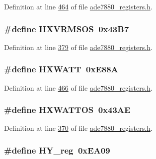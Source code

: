 Definition at line \hyperlink{a00036_source_l00464}{464} of file \hyperlink{a00036_source}{ade7880\-\_\-registers.\-h}.

\hypertarget{a00036_a88614989eb05e4e7fb74c61d77e33abf}{
\subsubsection[{H\-X\-V\-R\-M\-S\-O\-S}]{\setlength{\rightskip}{0pt plus 5cm}\#define H\-X\-V\-R\-M\-S\-O\-S~0x43\-B7}}\label{de/d8c/a00036_a88614989eb05e4e7fb74c61d77e33abf}


Definition at line \hyperlink{a00036_source_l00379}{379} of file \hyperlink{a00036_source}{ade7880\-\_\-registers.\-h}.

\hypertarget{a00036_a41b00ce2b5d9729f5783c2bf4ad50b35}{
\subsubsection[{H\-X\-W\-A\-T\-T}]{\setlength{\rightskip}{0pt plus 5cm}\#define H\-X\-W\-A\-T\-T~0x\-E88\-A}}\label{de/d8c/a00036_a41b00ce2b5d9729f5783c2bf4ad50b35}


Definition at line \hyperlink{a00036_source_l00466}{466} of file \hyperlink{a00036_source}{ade7880\-\_\-registers.\-h}.

\hypertarget{a00036_a648ebd2ef4dfa6ffc1aac4bf47ddf991}{
\subsubsection[{H\-X\-W\-A\-T\-T\-O\-S}]{\setlength{\rightskip}{0pt plus 5cm}\#define H\-X\-W\-A\-T\-T\-O\-S~0x43\-A\-E}}\label{de/d8c/a00036_a648ebd2ef4dfa6ffc1aac4bf47ddf991}


Definition at line \hyperlink{a00036_source_l00370}{370} of file \hyperlink{a00036_source}{ade7880\-\_\-registers.\-h}.

\hypertarget{a00036_a9ede8f30bf9b21236bcc1d43fac0d18b}{
\subsubsection[{H\-Y\-\_\-reg}]{\setlength{\rightskip}{0pt plus 5cm}\#define H\-Y\-\_\-reg~0x\-E\-A09}}\label{de/d8c/a00036_a9ede8f30bf9b21236bcc1d43fac0d18b}


